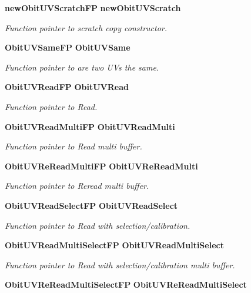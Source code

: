 \begin{CompactItemize}
{\bf new\-Obit\-UVScratch\-FP} {\bf new\-Obit\-UVScratch}
\begin{CompactList}\small\item\em Function pointer to scratch copy constructor. \item\end{CompactList}\item 
{\bf Obit\-UVSame\-FP} {\bf Obit\-UVSame}
\begin{CompactList}\small\item\em Function pointer to are two UVs the same. \item\end{CompactList}\item 
{\bf Obit\-UVRead\-FP} {\bf Obit\-UVRead}
\begin{CompactList}\small\item\em Function pointer to Read. \item\end{CompactList}\item 
{\bf Obit\-UVRead\-Multi\-FP} {\bf Obit\-UVRead\-Multi}
\begin{CompactList}\small\item\em Function pointer to Read multi buffer. \item\end{CompactList}\item 
{\bf Obit\-UVRe\-Read\-Multi\-FP} {\bf Obit\-UVRe\-Read\-Multi}
\begin{CompactList}\small\item\em Function pointer to Reread multi buffer. \item\end{CompactList}\item 
{\bf Obit\-UVRead\-Select\-FP} {\bf Obit\-UVRead\-Select}
\begin{CompactList}\small\item\em Function pointer to Read with selection/calibration. \item\end{CompactList}\item 
{\bf Obit\-UVRead\-Multi\-Select\-FP} {\bf Obit\-UVRead\-Multi\-Select}
\begin{CompactList}\small\item\em Function pointer to Read with selection/calibration multi buffer. \item\end{CompactList}\item 
{\bf Obit\-UVRe\-Read\-Multi\-Select\-FP} {\bf Obit\-UVRe\-Read\-Multi\-Select}

\end{CompactItemize}
